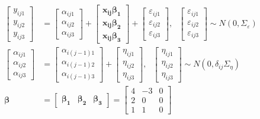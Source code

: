 \documentclass[
]{article}
\begin{document}
\begin{equation}\label{eq:mod}
\begin{aligned}
\begin{bmatrix}
y_{ij1}\\
y_{ij2}\\
y_{ij3}
\end{bmatrix}
&= \begin{bmatrix}
\alpha_{ij1}\\
\alpha_{ij2}\\
\alpha_{ij3}
\end{bmatrix}
+ 
\begin{bmatrix}
\boldsymbol{x_{ij}\beta_1}\\
\boldsymbol{x_{ij}\beta_2}\\
\boldsymbol{x_{ij}\beta_3} 
\end{bmatrix} +
\begin{bmatrix}
\varepsilon_{ij1}\\
\varepsilon_{ij2}\\
\varepsilon_{ij3}
\end{bmatrix}, \ \ \ 
\begin{bmatrix}
\varepsilon_{ij1}\\
\varepsilon_{ij2}\\
\varepsilon_{ij3}
\end{bmatrix} 
\sim N(0, \Sigma_\varepsilon
)\\
\begin{bmatrix}
\alpha_{ij1}\\
\alpha_{ij2}\\
\alpha_{ij3}
\end{bmatrix} & = 
\begin{bmatrix}
\alpha_{i(j-1)1}\\
\alpha_{i(j-1)2}\\
\alpha_{i(j-1)3}
\end{bmatrix} +
\begin{bmatrix}
\eta_{ij1}\\
\eta_{ij2}\\
\eta_{ij3}
\end{bmatrix}, \ \ \
\begin{bmatrix}
\eta_{ij1}\\
\eta_{ij2}\\
\eta_{ij3}
\end{bmatrix} \sim N(0, \delta_{ij} \Sigma_\eta 
)\\
\boldsymbol{\beta} &= \begin{bmatrix} \boldsymbol{\beta_1} & \boldsymbol{\beta_2} &  \boldsymbol{\beta_3} \end{bmatrix} = 
\begin{bmatrix}
4 & -3 & 0\\
2 & 0 & 0\\
1 & 1 & 0
\end{bmatrix}
\end{aligned}
\end{equation}
\end{document}
